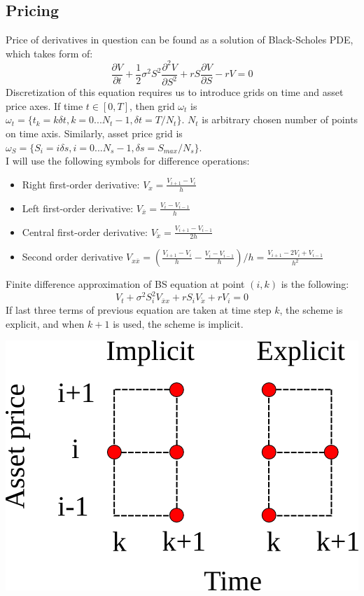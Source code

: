 \documentclass[11pt]{article} %
\begin{document}
\subsection{Pricing}
Price of derivatives in question can be found as a solution of Black-Scholes PDE, which takes form of:
\begin{equation}
\frac{\partial V}{\partial t} + \frac{1}{2}\sigma^2 S^2 \frac{\partial^2 V}{\partial S^2} +rS\frac{\partial V}{\partial S} - rV = 0
\end{equation}
Discretization of this equation requires us to introduce grids on time and asset price axes. If time $t \in [0,T]$, then grid $\omega_t$ is $\omega_t = \lbrace t_k = k\delta t, k = 0...N_t-1, \delta t = T/N_t\rbrace$. $N_t$ is arbitrary chosen number of points on time axis. Similarly, asset price grid is $\omega_S = \lbrace S_i = i\delta s, i = 0...N_s-1, \delta s = S_{max}/N_s\rbrace$.\\

I will use the following symbols for difference operations:
\begin{itemize}
	\item Right first-order derivative: $V_x =\frac{V_{i+1}-V_i}{h}$
	\item Left first-order derivative: $V_{\overline{x}} =\frac{V_{i}-V_{i-1}}{h}$
	\item Central first-order derivative: $V_{\mathring{x}} =\frac{V_{i+1}-V_{i-1}}{2h}$
	\item Second order derivative $V_{x\overline{x}} = \left(\frac{V_{i+1}-V_i}{h} - \frac{V_{i}-V_{i-1}}{h}\right)/h = \frac{V_{i+1}-2V_{i}+V_{i-1}}{h^2}$
\end{itemize}
Finite difference approximation of BS equation at point $(i,k)$ is the following:
\begin{equation}
V_t + \sigma^2 S_i^2 V_{\overline{x}x} + r S_i V_{\mathring{x}} + rV_i = 0
\end{equation}
If last three terms of previous equation are taken at time step $k$, the scheme is explicit, and when $k+1$ is used, the scheme is implicit.

\includegraphics[scale=0.5]{schemes.png}\\ 
\end{document}
